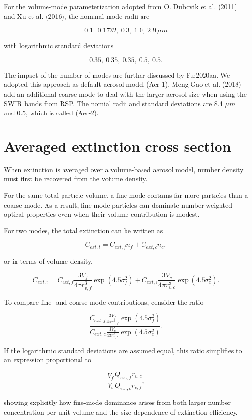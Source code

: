 \documentclass[
  11pt,
  letterpaper,
  DIV=11,
  numbers=noendperiod]{scrreprt}
\begin{document}
For the volume-mode parameterization adopted from O. Dubovik et al.
(2011) and Xu et al. (2016), the nominal mode radii are

\[
0.1,\ 0.1732,\ 0.3,\ 1.0,\ 2.9 \ \mu m
\]

with logarithmic standard deviations

\[
0.35,\ 0.35,\ 0.35,\ 0.5,\ 0.5.
\]

The impact of the number of modes are further discussed by Fu:2020aa. We
adopted this approach as default aerosol model (Aer-1). Meng Gao et al.
(2018) add an additional coarse mode to deal with the larger aerosol
size when using the SWIR bands from RSP. The nomial radii and standard
deviations are 8.4 \(\mu m\) and 0.5, which is called (Aer-2).

\section{Averaged extinction cross
section}\label{averaged-extinction-cross-section}

When extinction is averaged over a volume-based aerosol model, number
density must first be recovered from the volume density.

For the same total particle volume, a fine mode contains far more
particles than a coarse mode. As a result, fine-mode particles can
dominate number-weighted optical properties even when their volume
contribution is modest.

For two modes, the total extinction can be written as

\[
C_{ext,t}=C_{ext,f} n_f+C_{ext,c} n_c,
\]

or in terms of volume density,

\[
C_{ext,t}= C_{ext,f} \frac{3 V_f}{4\pi r^3_{v,f}}\exp(4.5 \sigma^2_f)+
C_{ext,c} \frac{3 V_c}{4\pi r^3_{v,c}}\exp(4.5 \sigma^2_c).
\]

To compare fine- and coarse-mode contributions, consider the ratio

\[
\frac{C_{ext,f} \frac{3 V_f}{4\pi r^3_{v,f}}\exp(4.5 \sigma^2_f)}
{C_{ext,c} \frac{3 V_c}{4\pi r^3_{v,c}}\exp(4.5 \sigma^2_c)}.
\]

If the logarithmic standard deviations are assumed equal, this ratio
simplifies to an expression proportional to

\[
\frac{V_f}{V_c}\frac{Q_{ext,f} r_{v,c}}{Q_{ext,c} r_{v,f}},
\]

showing explicitly how fine-mode dominance arises from both larger
number concentration per unit volume and the size dependence of
extinction efficiency.
\end{document}
